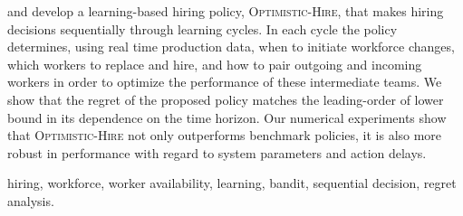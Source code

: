 \documentclass[opre,blindrev]{informs3}
\begin{document}
{%
and develop a learning-based hiring policy, \textsc{Optimistic-Hire}, that makes hiring decisions sequentially through learning cycles. In each cycle the policy determines, using real time production data, when to initiate workforce changes, 
which workers to replace and hire, %
and how to pair outgoing and incoming workers in order to %
optimize the performance of these intermediate teams. We show that the regret of the proposed policy matches the leading-order of lower bound in its dependence on the time horizon. Our numerical experiments show that \textsc{Optimistic-Hire} not only outperforms %
benchmark policies, it is also more robust in performance with regard to system parameters and action delays. 

\vspace{.15in}


 hiring, workforce, worker availability, learning, bandit, sequential decision, regret analysis. 

}


\maketitle

\end{document}

